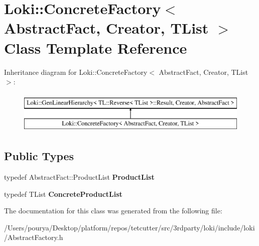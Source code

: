 \hypertarget{classLoki_1_1ConcreteFactory}{}\section{Loki\+:\+:Concrete\+Factory$<$ Abstract\+Fact, Creator, T\+List $>$ Class Template Reference}
\label{classLoki_1_1ConcreteFactory}
Inheritance diagram for Loki\+:\+:Concrete\+Factory$<$ Abstract\+Fact, Creator, T\+List $>$\+:\begin{figure}[H]
\begin{center}
\leavevmode
\includegraphics[height=2.000000cm]{classLoki_1_1ConcreteFactory}
\end{center}
\end{figure}
\subsection*{Public Types}
\begin{DoxyCompactItemize}
\item 
\hypertarget{classLoki_1_1ConcreteFactory_a85685f149ffa8f7263c3d44eb18191e4}{}typedef Abstract\+Fact\+::\+Product\+List {\bfseries Product\+List}\label{classLoki_1_1ConcreteFactory_a85685f149ffa8f7263c3d44eb18191e4}

\item 
\hypertarget{classLoki_1_1ConcreteFactory_a5cbb31503b9d6ad9c801b7c3e91d0de7}{}typedef T\+List {\bfseries Concrete\+Product\+List}\label{classLoki_1_1ConcreteFactory_a5cbb31503b9d6ad9c801b7c3e91d0de7}

\end{DoxyCompactItemize}


The documentation for this class was generated from the following file\+:\begin{DoxyCompactItemize}
\item 
/\+Users/pourya/\+Desktop/platform/repos/tetcutter/src/3rdparty/loki/include/loki/Abstract\+Factory.\+h\end{DoxyCompactItemize}
